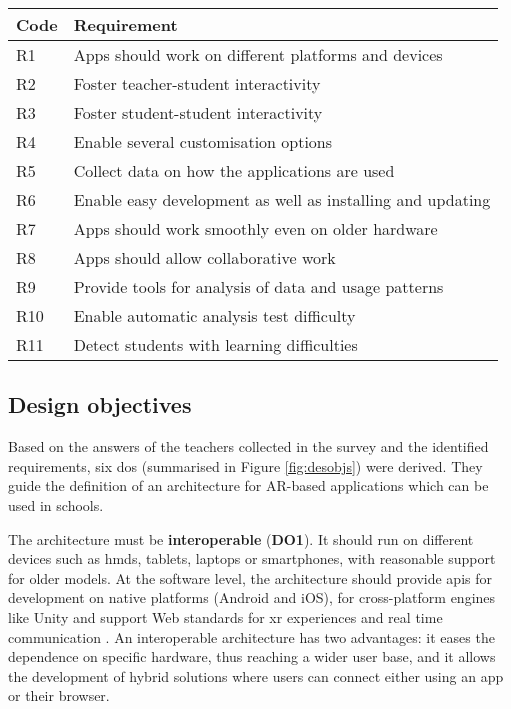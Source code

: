\begin{table*}[ht]\centering
\caption{\fontsize{10pt}{11pt}}
\begin{tabular}{p{}>{\arraybackslash}p{}}
\toprule
Code & Requirement\\
\midrule
R1 & Apps should work on different platforms and devices\\
R2 & Foster teacher-student interactivity\\
R3 &  Foster student-student interactivity\\
R4 & Enable several customisation options\\
R5 & Collect data on how the applications are used\\
R6 & Enable easy development as well as installing and updating\\
R7 & Apps should work smoothly even on older hardware\\
R8 & Apps should allow collaborative work\\
R9 & Provide tools for analysis of data and usage patterns\\
R10 & Enable automatic analysis test difficulty \\
R11 & Detect students with learning difficulties \\
\bottomrule
\end{tabular}
\label{arch:tab:summaryreqs}
\end{table*}

\subsection{Design objectives}\label{arch:req:desobj}

Based on the answers of the teachers collected in the survey and the identified requirements, six \glspl{do} (summarised in Figure \ref{fig:desobjs})  were derived. They guide the definition of an architecture for AR-based applications which can be used in schools.

The architecture must be \textbf{interoperable} (\textbf{DO1}). It should run on different devices such as \glspl{hmd}, tablets, laptops or smartphones, with reasonable support for older models. At the software level, the architecture should provide \glspl{api} for development on native platforms (Android and iOS), for cross-platform engines like Unity and support Web standards for \gls{xr} experiences \citep{Goregaokar:22:WDA} and real time communication \citep{rfc7478}. An interoperable architecture has two advantages: it eases the dependence on specific hardware, thus reaching a wider user base, and it allows the development of hybrid solutions where users can connect either using an app or their browser.


